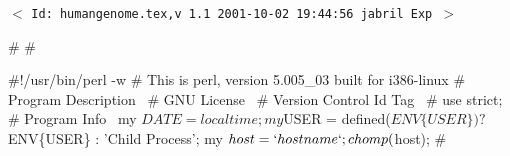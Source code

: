 \documentclass[11pt]{article}
\def\nwendcode{\endtrivlist \endgroup} %
\let\nwdocspar=\par                    %
\begin{document}
\vfill
\begin{center}
{\small$<$ \verb$Id: humangenome.tex,v 1.1 2001-10-02 19:44:56 jabril Exp $$>$ }
\end{center}


\newpage %

\setcounter{page}{1}




\nwenddocs{}\endmoddef
#
#
\nwendcode{}\nwdocspar

\begin{comment}
\end{comment}


% 
% 
% 

\newpage %
\appendix



\begin{comment}
\end{comment}

%
\newpage %



\nwenddocs{}\endmoddef
#!/usr/bin/perl -w
# This is perl, version 5.005_03 built for i386-linux
#
\LA{}Program Description~{\nwtagstyle{}}\RA{}
#
\LA{}GNU License~{\nwtagstyle{}}\RA{}
#
\LA{}Version Control Id Tag~{\nwtagstyle{}}\RA{}
#
use strict;
#
\LA{}Program Info~{\nwtagstyle{}}\RA{}
my $DATE = localtime;
my $USER = defined($ENV\{USER\}) ? $ENV\{USER\} : 'Child Process';
my $host = `hostname`;
chomp($host);
#
\nwendcode{}\nwdocspar
\end{document}
